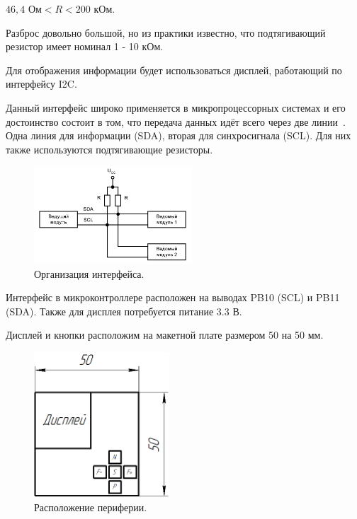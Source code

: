 \begin{center}
	$46,4$ Ом$ < R < 200$ кОм.
\end{center}	

	Разброс довольно большой, но из практики известно, что подтягивающий резистор имеет номинал 1 - 10 кОм.
	
	Для отображения информации будет использоваться дисплей, работающий по интерфейсу I2C.	
	
	Данный интерфейс широко применяется в микропроцессорных системах и его достоинство состоит в том, что передача данных идёт всего через две линии~\cite{schemat}. Одна линия для информации (SDA), вторая для синхросигнала (SCL). Для них также используются подтягивающие резисторы.
	
	\begin{figure}[H]
    \centering
    \includegraphics[width=0.525\textwidth]{../image/i2c.png}
    \caption{Организация интерфейса.}
	\end{figure}
	
	Интерфейс в микроконтроллере расположен на выводах PB10 (SCL) и PB11 (SDA). Также для дисплея потребуется питание 3.3 В.
	
	Дисплей и кнопки расположим на макетной плате размером 50 на 50 мм.
	
	\begin{figure}[H]
    \centering
    \includegraphics[width=0.45\textwidth]{../image/func_gen.png}
    \caption{Расположение периферии.}
	\end{figure}
	
